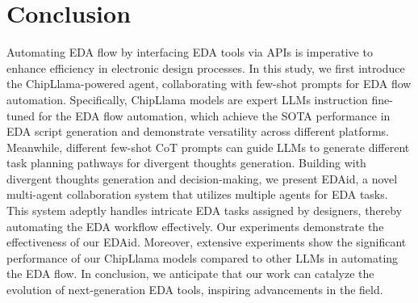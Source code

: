 \section{Conclusion}
\label{sec:conclu}
Automating EDA flow by interfacing EDA tools via APIs is imperative to enhance efficiency in electronic design processes.
In this study, we first introduce the ChipLlama-powered agent, collaborating with few-shot prompts for EDA flow automation.
Specifically, ChipLlama models are expert LLMs instruction fine-tuned for the EDA flow automation, which achieve the SOTA performance in EDA script generation and demonstrate versatility across different platforms.
Meanwhile, different few-shot CoT prompts can guide LLMs to generate different task planning pathways for divergent thoughts generation.
Building with divergent thoughts generation and decision-making, we present EDAid, a novel multi-agent collaboration system that utilizes multiple agents for EDA tasks.
This system adeptly handles intricate EDA tasks assigned by designers, thereby automating the EDA workflow effectively.
Our experiments demonstrate the effectiveness of our EDAid.
Moreover, extensive experiments show the significant performance of our ChipLlama models compared to other LLMs in automating the EDA flow.
In conclusion, we anticipate that our work can catalyze the evolution of next-generation EDA tools, inspiring advancements in the field.